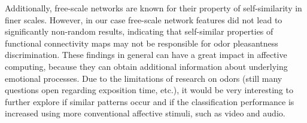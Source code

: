Additionally, free-scale networks are known for their property of self-similarity in finer scales. However, in our case free-scale network features did not lead to significantly non-random results, indicating that self-similar properties of functional connectivity maps may not be responsible for odor pleasantness discrimination. These findings in general can have a great impact in affective computing, because they can obtain additional information about underlying emotional processes. Due to the limitations of research on odors (still many questions open regarding exposition time, etc.), it would be very interesting to further explore if similar patterns occur and if the classification performance is increased using more conventional affective stimuli, such as video and audio.   


